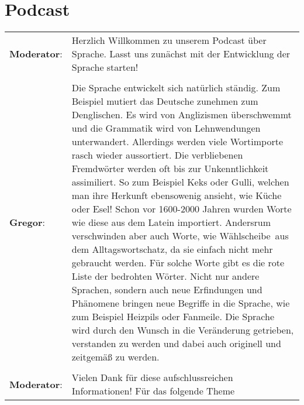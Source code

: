 \documentclass[12pt,a4paper]{report}
\newcommand{\mod}[0]{\textbf{Moderator}:&}
\newcommand{\gregor}[0]{\textbf{Gregor}:&}
\begin{document}
	\section{Podcast}
	\begin{tabularx}{\textwidth}{sX}
		\mod Herzlich Willkommen zu unserem Podcast über Sprache. Lasst uns zunächst mit der Entwicklung der Sprache starten! \\\\
		\gregor Die Sprache entwickelt sich natürlich ständig. Zum Beispiel mutiert das Deutsche zunehmen zum Denglischen. Es wird von Anglizismen überschwemmt und die Grammatik wird von Lehnwendungen unterwandert. Allerdings werden viele Wortimporte rasch wieder aussortiert. Die verbliebenen Fremdwörter werden oft bis zur Unkenntlichkeit assimiliert. So zum Beispiel Keks oder Gulli, welchen man ihre Herkunft ebensowenig ansieht, wie Küche oder Esel! Schon vor 1600-2000 Jahren wurden Worte wie diese aus dem Latein importiert. Andersrum verschwinden aber auch Worte, wie \dq Wählscheibe\dq\ aus dem Alltagswortschatz, da sie einfach nicht mehr gebraucht werden. Für solche Worte gibt es die rote Liste der bedrohten Wörter. Nicht nur andere Sprachen, sondern auch neue Erfindungen und Phänomene bringen neue Begriffe in die Sprache, wie zum Beispiel Heizpils oder Fanmeile. Die Sprache wird durch den Wunsch in die Veränderung getrieben, verstanden zu werden und dabei auch originell und zeitgemäß zu werden.\\\\
		\mod Vielen Dank für diese aufschlussreichen Informationen! Für das folgende Theme
	\end{tabularx}
\end{document}
